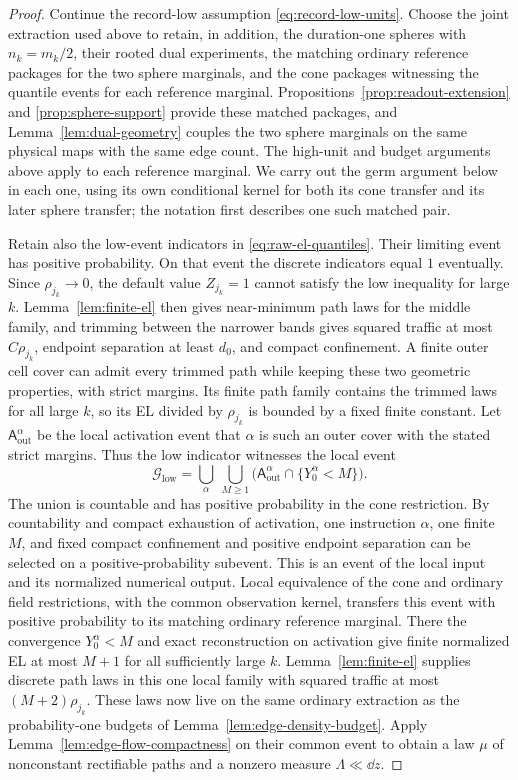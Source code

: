 \begin{proof}
Continue the record-low assumption \eqref{eq:record-low-units}.  Choose the
joint extraction used above to retain, in addition, the duration-one
spheres with \(n_k=m_k/2\), their rooted dual experiments, the matching
ordinary reference packages for the two sphere marginals, and the cone
packages witnessing the quantile events for each reference marginal.
Propositions~\ref{prop:readout-extension} and \ref{prop:sphere-support}
provide these matched packages, and Lemma~\ref{lem:dual-geometry} couples
the two sphere marginals on the same physical maps with the same edge
count.  The high-unit and budget arguments above apply to each reference
marginal.  We carry out the germ argument below in each one, using its own
conditional kernel for both its cone transfer and its later sphere
transfer; the notation first describes one such matched pair.

Retain also the low-event indicators in \eqref{eq:raw-el-quantiles}.  Their
limiting event has positive probability.  On that event the discrete
indicators equal \(1\) eventually.  Since \(\rho_{j_k}\to0\), the default
value \(Z_{j_k}=1\) cannot satisfy the low inequality for large \(k\).
Lemma~\ref{lem:finite-el} then gives
near-minimum path laws for the middle family, and trimming between the
narrower bands gives squared traffic at most \(C\rho_{j_k}\), endpoint
separation at least \(d_0\), and compact confinement.  A finite outer
cell cover can admit every trimmed path while keeping these two geometric
properties, with strict margins.  Its finite path family contains the
trimmed laws for all large \(k\), so its EL divided by \(\rho_{j_k}\)
is bounded by a fixed finite constant.  Let
\(\mathsf A_{\mathrm{out}}^\alpha\) be the local activation event that
\(\alpha\) is such an outer cover with the stated strict margins.  Thus
the low indicator witnesses the local event
\begin{equation}\label{eq:low-unit-event}
 \mathcal G_{\mathrm{low}}
 =\bigcup_{\alpha}\ \bigcup_{M\ge1}
  \bigl(\mathsf A_{\mathrm{out}}^\alpha\cap\{Y_0^\alpha<M\}\bigr).
\end{equation}
The union is countable and has positive probability in the cone
restriction.  By countability and compact exhaustion of activation,
one instruction \(\alpha\), one finite \(M\), and fixed compact
confinement and positive endpoint separation can be selected on a
positive-probability subevent.  This is an event of the local input and
its normalized numerical output.  Local equivalence of the cone and
ordinary field restrictions, with the common observation kernel,
transfers this event with positive probability to its matching ordinary
reference marginal.
There the convergence \(Y_0^\alpha<M\) and exact reconstruction on
activation give finite normalized EL at most \(M+1\) for all sufficiently
large \(k\).  Lemma~\ref{lem:finite-el} supplies discrete path laws in
this one local family with squared traffic at most
\((M+2)\rho_{j_k}\).  These laws now live on the same ordinary extraction
as the probability-one budgets of Lemma~\ref{lem:edge-density-budget}.
Apply Lemma~\ref{lem:edge-flow-compactness} on their common event to obtain
a law \(\mu\) of nonconstant rectifiable paths and a nonzero measure
\(\Lambda\ll\dd z\).


\end{proof}
